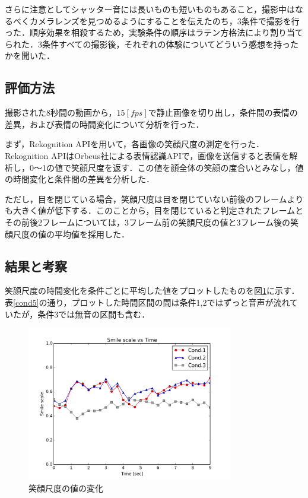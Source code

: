 \documentclass[submit,techreq]{ec2014}
\begin{document}
さらに注意としてシャッター音には長いものも短いものもあること，撮影中はなるべくカメラレンズを見つめるようにすることを伝えたのち，3条件で撮影を行った．順序効果を相殺するため，実験条件の順序はラテン方格法により割り当てられた．3条件すべての撮影後，それぞれの体験についてどういう感想を持ったかを聞いた．


\subsection{評価方法}

撮影された8秒間の動画から，$15 [fps]$で静止画像を切り出し，条件間の表情の差異，および表情の時間変化について分析を行った．

まず，Rekognition APIを用いて，各画像の笑顔尺度の測定を行った．Rekognition APIはOrbeus社による表情認識APIで，画像を送信すると表情を解析し，0〜1の値で笑顔尺度を返す．この値を顔全体の笑顔の度合いとみなし，値の時間変化と条件間の差異を分析した．

ただし，目を閉じている場合，笑顔尺度は目を閉じていない前後のフレームよりも大きく値が低下する．このことから，目を閉じていると判定されたフレームとその前後2フレームについては，3フレーム前の笑顔尺度の値と3フレーム後の笑顔尺度の値の平均値を採用した．

\subsection{結果と考察}

笑顔尺度の時間変化を条件ごとに平均した値をプロットしたものを図\ref{graph-smooth}に示す．表\ref{cond5}の通り，プロットした時間区間の間は条件1,2ではずっと音声が流れていたが，条件3では無音の区間も含む．

\begin{figure}[h!]
  \centering  
\includegraphics[width=90mm, bb=0 0 600 450]{images/smooth5_avg.png}
\caption{笑顔尺度の値の変化}
  \label{graph-smooth}
\end{figure}
\end{document}
